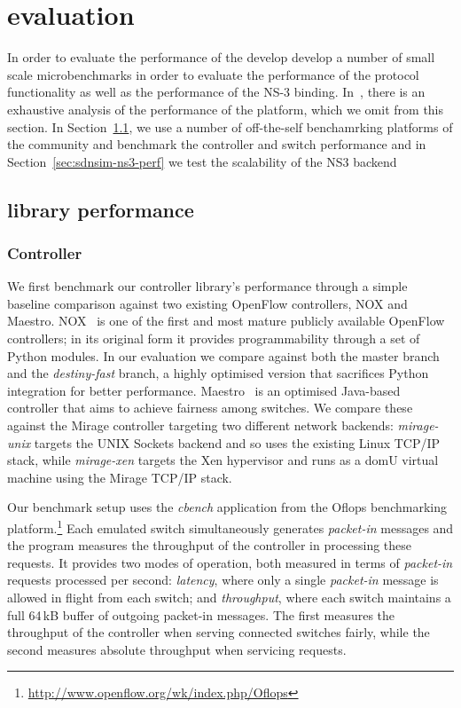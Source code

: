 \section{\sdnsim evaluation} \label{sec:sdnsim-precision}

In order to evaluate the performance of the develop develop a number of small scale
microbenchmarks in order to evaluate the performance of the \of protocol
functionality as well as the performance of the NS-3 binding.
In~\cite{unikernel}, there is an exhaustive analysis of the performance of the
\mirage platform, which we omit from this section. In Section~\ref{sec:of-perf},
we use a number of off-the-self benchamrking platforms of the \of community
and benchmark the \of controller and switch performance and in
Section~\ref{sec:sdnsim-ns3-perf} we test the scalability of the NS3
backend 

\subsection{\of library performance} \label{sec:of-perf}

\subsubsection*{Controller}

We first benchmark our controller library's performance through a simple
baseline comparison against two existing OpenFlow controllers, NOX and
Maestro. NOX~\cite{nox} is one of the first and most mature publicly available
OpenFlow controllers; in its original form it provides programmability through
a set of Python modules. In our evaluation we compare against both the master
branch and the \emph{destiny-fast} branch, a highly optimised version that
sacrifices Python integration for better performance. Maestro~\cite{maestro}
is an optimised Java-based controller that aims to achieve fairness among
switches. We compare these against the Mirage controller targeting two
different network backends: \emph{mirage-unix} targets the UNIX Sockets
backend and so uses the existing Linux TCP/IP stack, while \emph{mirage-xen}
targets the Xen hypervisor and runs as a domU virtual machine using the Mirage
TCP/IP stack.

Our benchmark setup uses the \emph{cbench} application from the Oflops
benchmarking
platform.\footnote{\url{http://www.openflow.org/wk/index.php/Oflops}} Each
emulated switch simultaneously generates \emph{packet-in} messages and the
program measures the throughput of the controller in processing these
requests. It provides two modes of operation, both measured in terms of
\emph{packet-in} requests processed per second: \emph{latency}, where only a single
\emph{packet-in} message is allowed in flight from each switch; and
\emph{throughput}, where each switch maintains a full 64\,kB buffer of
outgoing packet-in messages. The first measures the throughput of the
controller when serving connected switches fairly, while the second measures
absolute throughput when servicing requests.
                                                                       
